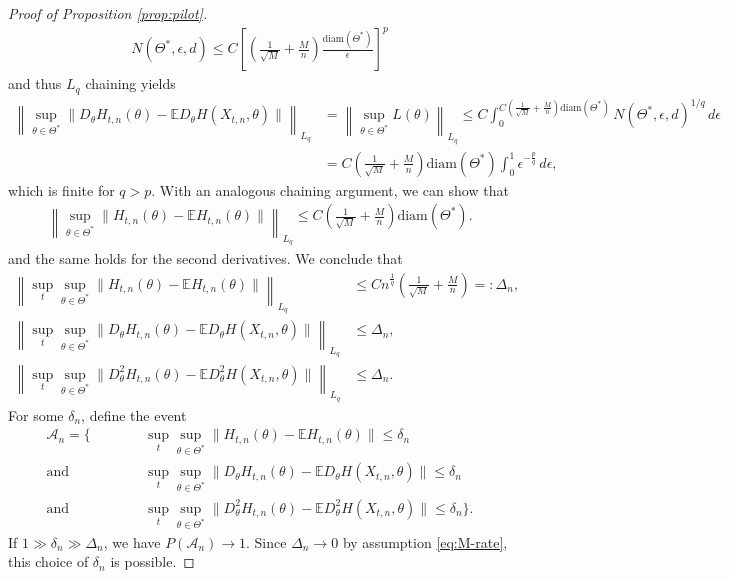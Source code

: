 \documentclass[10pt, a4paper]{article}
\theoremstyle{assumption}
\theoremstyle{definition}
\theoremstyle{theorem}
\newcommand{\E}{\mathbb{E}}
\begin{document}
\begin{proof}[Proof of Proposition \ref{prop:pilot}]
    \begin{align*}
        N(\Theta^*, \epsilon, d) \leq C \left[\left( \tfrac{1}{\sqrt{M}} + \tfrac{M}{n} \right) \frac{\text{diam}(\Theta^*)}{\epsilon} \right]^{p}
    \end{align*}
    and thus $L_q$ chaining yields
    \begin{align*}
        \left\|\sup_{\theta\in\Theta^*}\| D_\theta H_{t,n}(\theta) - \E D_\theta H(X_{t,n},\theta)\|\right\|_{L_q} 
        &= \left\|\sup_{\theta\in\Theta^*}L(\theta)\right\|_{L_q} \leq C \int_0^{C\left( \tfrac{1}{\sqrt{M}} + \tfrac{M}{n} \right) \text{diam}(\Theta^*)} N(\Theta^*, \epsilon, d)^{1/q}\, d\epsilon\\
        &= C \left( \tfrac{1}{\sqrt{M}} + \tfrac{M}{n} \right) \text{diam}(\Theta^*) \int_0^1 \epsilon^{-\frac{p}{q}}\, d\epsilon,
    \end{align*}
    which is finite for $q>p$.
    With an analogous chaining argument, we can show that
    \begin{align*}
        \left\|\sup_{\theta\in\Theta^*} \| H_{t,n}(\theta)-\E H_{t,n}(\theta) \|  \right\|_{L_q}\leq C \left( \tfrac{1}{\sqrt{M}} + \tfrac{M}{n} \right) \text{diam}(\Theta^*).
    \end{align*}
    and the same holds for the second derivatives.
    We conclude that
    \begin{align*}
         \left\|\sup_t \sup_{\theta\in\Theta^*} \| H_{t,n}(\theta)-\E H_{t,n}(\theta) \|  \right\|_{L_q} &\leq C n^{\frac{1}{q}} \left( \tfrac{1}{\sqrt{M}} + \tfrac{M}{n} \right) =:\Delta_n,\\
         \left\|\sup_t \sup_{\theta\in\Theta^*}\| D_\theta H_{t,n}(\theta) - \E D_\theta H(X_{t,n},\theta)\|\right\|_{L_q} &\leq \Delta_n, \\
         \left\|\sup_t \sup_{\theta\in\Theta^*}\| D^2_\theta H_{t,n}(\theta) - \E D^2_\theta H(X_{t,n},\theta)\|\right\|_{L_q} &\leq \Delta_n.
    \end{align*}
    For some $\delta_n$, define the event
    \begin{align*}
        \mathcal{A}_n = \Big\{ \qquad\quad
        &\sup_t \sup_{\theta\in\Theta^*} \| H_{t,n}(\theta)-\E H_{t,n}(\theta) \| \leq \delta_n\\
        \text{and}\quad &\sup_t \sup_{\theta\in\Theta^*}\| D_\theta H_{t,n}(\theta) - \E D_\theta H(X_{t,n},\theta)\| \leq \delta_n \\
        \text{and} \quad &\sup_t \sup_{\theta\in\Theta^*}\| D^2_\theta H_{t,n}(\theta) - \E D^2_\theta H(X_{t,n},\theta)\| \leq \delta_n\Big\}.
    \end{align*}
    If $1\gg\delta_n\gg \Delta_n$, we have $P(\mathcal{A}_n)\to 1$.
    Since $\Delta_n\to 0$ by assumption \eqref{eq:M-rate}, this choice of $\delta_n$ is possible.
    

\end{proof}
\end{document}
